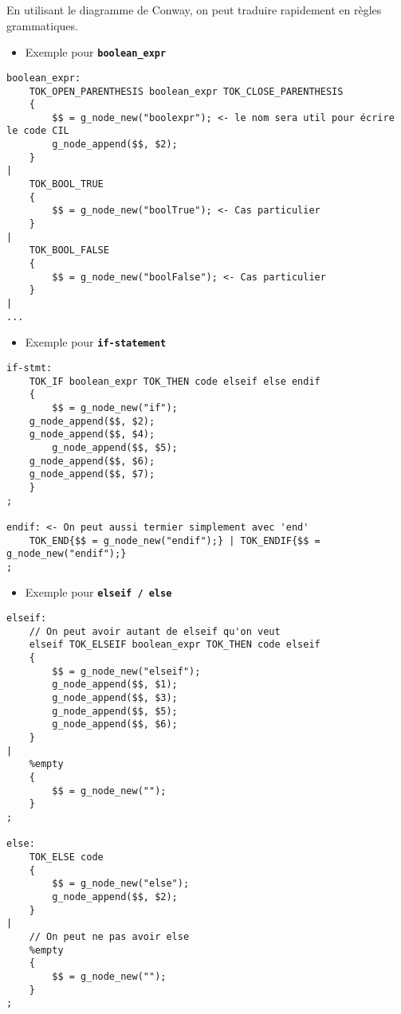 \documentclass[11pt]{article}
\providecommand{\tightlist}{%
      \setlength{\itemsep}{0pt}\setlength{\parskip}{0pt}}
\begin{document}
En utilisant le diagramme de Conway, on peut traduire rapidement en
règles grammatiques.

\begin{itemize}
\tightlist
\item
  Exemple pour \textbf{\texttt{boolean\_expr}}
\end{itemize}

\begin{verbatim}
boolean_expr:
    TOK_OPEN_PARENTHESIS boolean_expr TOK_CLOSE_PARENTHESIS
    {
        $$ = g_node_new("boolexpr"); <- le nom sera util pour écrire le code CIL
        g_node_append($$, $2);
    }
|
    TOK_BOOL_TRUE
    {
        $$ = g_node_new("boolTrue"); <- Cas particulier 
    }
|
    TOK_BOOL_FALSE
    {
        $$ = g_node_new("boolFalse"); <- Cas particulier
    }
|
...
\end{verbatim}

\begin{itemize}
\tightlist
\item
  Exemple pour \textbf{\texttt{if-statement}}
\end{itemize}

\begin{verbatim}
if-stmt: 
    TOK_IF boolean_expr TOK_THEN code elseif else endif
    {
        $$ = g_node_new("if");
    g_node_append($$, $2);
    g_node_append($$, $4);
        g_node_append($$, $5);
    g_node_append($$, $6);
    g_node_append($$, $7);
    }
;

endif: <- On peut aussi termier simplement avec 'end' 
    TOK_END{$$ = g_node_new("endif");} | TOK_ENDIF{$$ = g_node_new("endif");}
;
\end{verbatim}

    \begin{itemize}
\tightlist
\item
  Exemple pour \textbf{\texttt{elseif\ /\ else}}
\end{itemize}

\begin{verbatim}
elseif: 
    // On peut avoir autant de elseif qu'on veut
    elseif TOK_ELSEIF boolean_expr TOK_THEN code elseif
    {
        $$ = g_node_new("elseif");
        g_node_append($$, $1);
        g_node_append($$, $3);
        g_node_append($$, $5);
        g_node_append($$, $6);
    }
|
    %empty
    {
        $$ = g_node_new("");
    }
;

else:
    TOK_ELSE code
    {
        $$ = g_node_new("else");
        g_node_append($$, $2);
    }
|
    // On peut ne pas avoir else
    %empty
    {
        $$ = g_node_new("");
    }
;
\end{verbatim}
\end{document}

